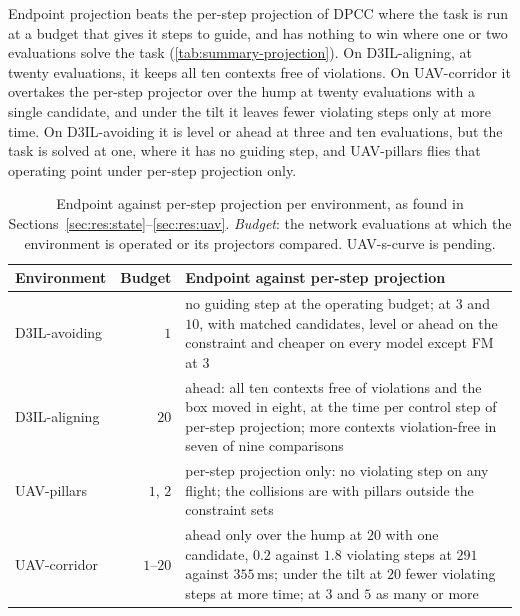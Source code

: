Endpoint projection beats the per-step projection of \ac{DPCC} where the task is run at a budget that gives
it steps to guide, and has nothing to win where one or two evaluations solve the task
(\autoref{tab:summary-projection}). On D3IL-aligning, at twenty evaluations, it keeps all ten contexts free
of violations. On UAV-corridor it overtakes the per-step projector over the hump at twenty evaluations with a
single candidate, and under the tilt it leaves fewer violating steps only at more time. On D3IL-avoiding it
is level or ahead at three and ten evaluations, but the task is solved at one, where it has no guiding step,
and UAV-pillars flies that operating point under per-step projection only.

\begin{table}[htpb]
  \caption[Projection methods across environments]{Endpoint against per-step projection per environment, as
  found in Sections~\ref{sec:res:state}--\ref{sec:res:uav}. \emph{Budget}: the network evaluations at which
  the environment is operated or its projectors compared. UAV-s-curve is pending.}
  \label{tab:summary-projection}
  \centering
  \small
  \begin{tabularx}{\linewidth}{@{}p{2.2cm} r L@{}}
    \toprule
    Environment & Budget & Endpoint against per-step projection \\
    \midrule
    D3IL-avoiding & $1$      & no guiding step at the operating budget; at $3$ and $10$, with matched candidates,
                               level or ahead on the constraint and cheaper on every model except FM at $3$ \\
    D3IL-aligning & $20$     & ahead: all ten contexts free of violations and the box moved in eight, at the time
                               per control step of per-step projection; more contexts violation-free in seven of
                               nine comparisons \\
    UAV-pillars   & $1$, $2$ & per-step projection only: no violating step on any flight; the collisions are with
                               pillars outside the constraint sets \\
    UAV-corridor  & $1$--$20$ & ahead only over the hump at $20$ with one candidate, $0.2$ against $1.8$ violating
                               steps at $291$ against $355$\,ms; under the tilt at $20$ fewer violating steps at
                               more time; at $3$ and $5$ as many or more \\
    \bottomrule
  \end{tabularx}
\end{table}

